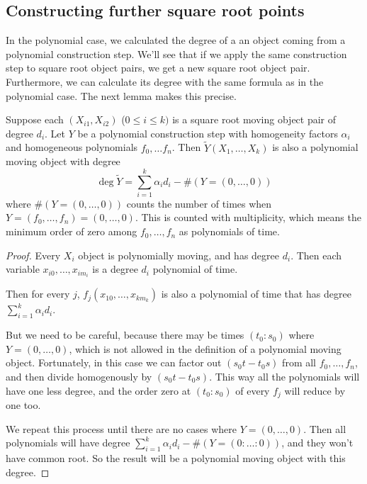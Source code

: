 \documentclass[a4paper]{article}
\begin{document}
\subsection{Constructing further square root points}

In the polynomial case, we calculated the degree of a an object coming from a polynomial construction step. We'll see that if we apply the same construction step to square root object pairs, we get a new square root object pair. Furthermore, we can calculate its degree with the same formula as in the polynomial case. The next lemma makes this precise.

\begin{lemma}
    Suppose each $(X_{i1}, X_{i2})$ ($0\le i\le k)$ is a square root moving object pair of degree $d_i$.
    Let $Y$ be a polynomial construction step with homogeneity factors $\alpha_i$ and homogeneous polynomials $f_0,\ldots f_n$. Then $\tilde{Y}(X_1,\ldots,X_k)$ is also a polynomial moving object with degree
    $$\deg \tilde{Y}=\sum_{i=1}^k \alpha_id_i-\#(Y=(0,\ldots,0))$$
    where $\#(Y=(0,\ldots,0))$ counts the number of times when $Y=(f_0,\ldots ,f_n)=(0,\ldots,0)$. This is counted with multiplicity, which means the minimum order of zero among $f_0,\ldots, f_n$ as polynomials of time.
\end{lemma}
\begin{proof}
    Every $X_i$ object is polynomially moving, and has degree $d_i$. Then each variable $x_{i0},\ldots ,x_{im_i}$ is a degree $d_i$ polynomial of time.

    Then for every $j$, $f_j(x_{10},\ldots ,x_{km_k})$ is also a polynomial of time that has degree $\sum_{i=1}^k \alpha_id_i$.

    But we need to be careful, because there may be times $(t_0:s_0)$ where $Y=(0,\ldots,0)$, which is not allowed in the definition of a polynomial moving object. Fortunately, in this case we can factor out $(s_0t-t_0s)$ from all $f_0,\ldots, f_n$, and then divide homogenously by $(s_0t-t_0s)$. This way all the polynomials will have one less degree, and the order zero at $(t_0:s_0)$ of every $f_j$ will reduce by one too.

    We repeat this process until there are no cases where $Y=(0,\ldots,0)$. Then all polynomials will have degree $\sum_{i=1}^k \alpha_id_i-\#(Y=(0:\ldots:0))$, and they won't have common root. So the result will be a polynomial moving object with this degree.
\end{proof}
\end{document}
